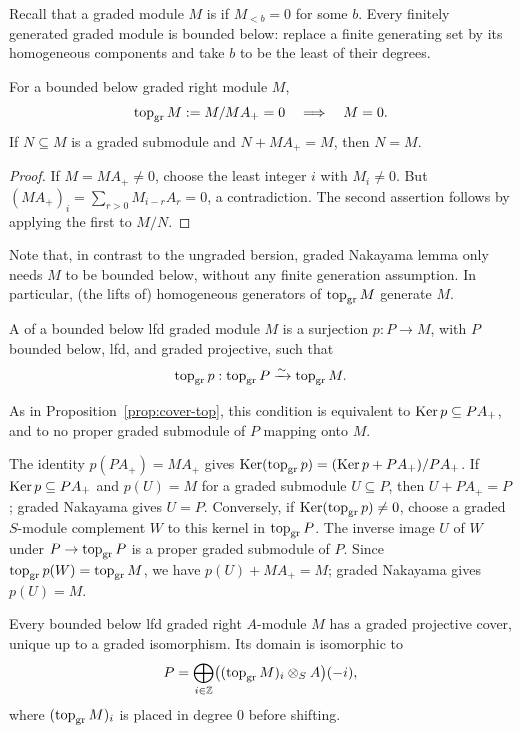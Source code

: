 Recall that a graded module $M$ is  if $M_{<b}=0$ for some $b$.
Every finitely generated graded module is bounded below: replace a finite generating set by its homogeneous components and take $b$ to be the least of their degrees.

\begin{lemma}\label{lem:graded-nakayama}
For a bounded below graded right module $M$,
\[
\grtop M:=M/MA_+=0\quad\Longrightarrow\quad M=0.
\]
If $N\subseteq M$ is a graded submodule and $N+MA_+=M$, then $N=M$.
\end{lemma}

\begin{proof}
If $M=MA_+\neq0$, choose the least integer $i$ with $M_i\neq0$.
But $(MA_+)_i=\sum_{r>0}M_{i-r}A_r=0$, a contradiction.
The second assertion follows by applying the first to $M/N$.
\end{proof}

Note that, in contrast to the ungraded bersion, graded Nakayama lemma only needs $M$ to be bounded below, without any finite generation assumption.
In particular, (the lifts of) homogeneous generators of $\grtop M$ generate $M$.

\begin{definition}\label{def:graded-projective-cover}
A  of a bounded below lfd graded module $M$ is a surjection $p:P\to M$, with $P$ bounded below, lfd, and graded projective, such that
\[
\grtop p:\grtop P\xrightarrow{\sim}\grtop M.
\]
\end{definition}

As in Proposition~\ref{prop:cover-top}, this condition is equivalent to $\Ker p\subseteq PA_+$, and to no proper graded submodule of $P$ mapping onto $M$.

\begin{supplementary}
The identity $p(PA_+)=MA_+$ gives $\Ker(\grtop p)=(\Ker p+PA_+)/PA_+$.
If $\Ker p\subseteq PA_+$ and $p(U)=M$ for a graded submodule $U\subseteq P$, then $U+PA_+=P$; graded Nakayama gives $U=P$.
Conversely, if $\Ker(\grtop p)\neq0$, choose a graded $S$-module complement $W$ to this kernel in $\grtop P$.
The inverse image $U$ of $W$ under $P\to\grtop P$ is a proper graded submodule of $P$.
Since $\grtop p(W)=\grtop M$, we have $p(U)+MA_+=M$; graded Nakayama gives $p(U)=M$.
\end{supplementary}

\begin{proposition}\label{prop:graded-projective-covers}
Every bounded below lfd graded right $A$-module $M$ has a graded projective cover, unique up to a graded isomorphism.
Its domain is isomorphic to
\begin{equation}\label{eq:graded-cover-terms}
P=\bigoplus_{i\in\Z}\bigl((\grtop M)_i\otimes_S A\bigr)(-i),
\end{equation}
where $(\grtop M)_i$ is placed in degree $0$ before shifting.
\end{proposition}

